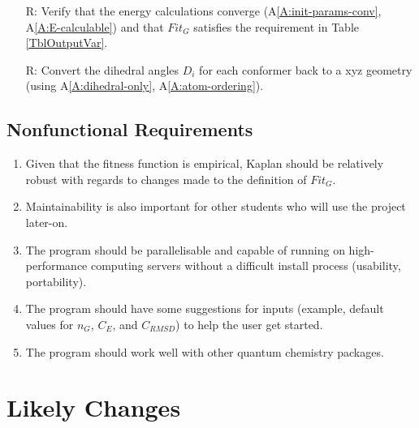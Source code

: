 \documentclass[12pt]{article}
\newcommand{\aref}[1]{A\ref{#1}}
\newcounter{reqnum} %
\newcommand{\progname}{Kaplan} %
\begin{document}
\begin{itemize}
\item[R\refstepcounter{reqnum}\thereqnum \label{R_VerifyOutput}:] Verify that 
the energy calculations converge (\aref{A:init-params-conv}, 
\aref{A:E-calculable}) and that $Fit_G$ satisfies 
the requirement in 
Table \ref{TblOutputVar}.

\item[R\refstepcounter{reqnum}\thereqnum \label{R_Output}:] Convert the 
dihedral angles $D_i$ for each conformer back to a xyz geometry (using 
\aref{A:dihedral-only}, \aref{A:atom-ordering}). 

\end{itemize}

\subsection{Nonfunctional Requirements}


\begin{enumerate}
	\item Given that the fitness function is 
	empirical, \progname{} should be relatively 
robust with regards to changes made to the definition 
of $Fit_G$.

\item Maintainability is also important for other 
students who will use the project 
later-on. 

\item The program should be parallelisable and capable 
of running on 
high-performance computing servers without a difficult install process 
(usability, portability). 

\item The program should have some suggestions for 
inputs (example, default values for $n_G$, $C_E$, and 
$C_{RMSD}$) to help the user get started. 

\item The program should work well with other quantum 
chemistry packages.

\end{enumerate}

\section{Likely Changes}    
\end{document}
